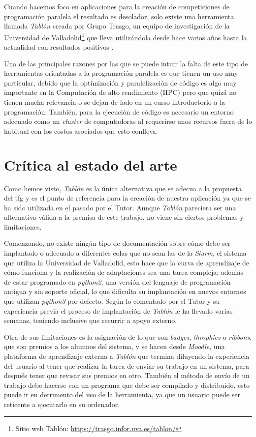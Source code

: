 \documentclass[11pt,spanish,listoffigures,listoftables]{tfgetsinf}
\begin{document}
Cuando hacemos foco en aplicaciones para la creación de competiciones de programación paralela el resultado es desolador, solo existe una herramienta llamada \textit{Tablón} creada por Grupo Trasgo, un equipo de investigación de la Universidad de Valladolid\footnote{Sitio web Tablón: \url{https://trasgo.infor.uva.es/tablon/}} que lleva utilizándola desde hace varios años hasta la actualidad con resultados positivos \cite{article-applying-gamification}.

Una de las principales razones por las que se puede intuir la falta de este tipo de herramientas orientadas a la programación paralela es que tienen un uso muy particular, debido que la optimización y paralelización de código es algo muy importante en la Computación de alto rendimiento (HPC) pero que quizá no tienen mucha relevancia o se dejan de lado en un curso introductorio a la programación. También, para la ejecución de código es necesario un entorno adecuado como un \textit{cluster} de computadoras al requerirse unos recursos fuera de lo habitual con los costos asociados que esto conlleva.

\section{Crítica al estado del arte}

Como hemos visto, \textit{Tablón} es la única alternativa que se adecua a la propuesta del \acrshort{tfg} y es el punto de referencia para la creación de nuestra aplicación ya que se ha sido utilizada en el pasado por el Tutor. Aunque \textit{Tablón} pareciera ser una alternativa válida a la premisa de este trabajo, no viene sin ciertos problemas y limitaciones.

Comenzando, no existe ningún tipo de documentación sobre cómo debe ser implantado o adecuado a diferentes \gls{cola}s que no sean las de la \textit{Slurm}, el sistema que utiliza la Universidad de Valladolid, esto hace que la curva de aprendizaje de cómo funciona y la realización de adaptaciones sea una tarea compleja; además de estar programado en \textit{python2}, una versión del lenguaje de programación antigua y sin soporte oficial, lo que dificulta su implantación en nuevos entornos que utilizan \textit{python3} por defecto. Según lo comentado por el Tutor y su experiencia previa el proceso de implantación de \textit{Tablón} le ha llevado varias semanas, teniendo inclusive que recurrir a apoyo externo.

Otra de sus limitaciones es la asignación de lo que son \textit{badges}, \textit{throphies} o \textit{ribbons}, que son premios a los alumnos del sistema, y se hacen desde \textit{Moodle}, una plataforma de aprendizaje externa a \textit{Tablón} que termina diluyendo la experiencia del usuario al tener que realizar la tarea de enviar su trabajo en un sistema, para después tener que revisar sus premios en otro. También el método de envío de un trabajo debe hacerse con un programa que debe ser compilado y distribuido, esto puede ir en detrimento del uso de la herramienta, ya que un usuario puede ser reticente a ejecutarlo en su ordenador.
\end{document}
